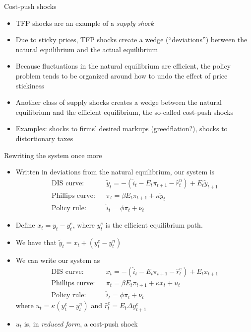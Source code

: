 \documentclass[9pt,xcolor={dvipsnames}]{beamer}
\newcommand{\bit}{\begin{itemize}}
\newcommand{\eit}{\end{itemize}}
\newcommand{\bc}{\color{blue}}
\begin{document}
\begin{frame}{Cost-push shocks}

\bit
\setlength\itemsep{1.5em}
\item TFP shocks are an example of a \emph{supply shock}

\item Due to sticky prices, TFP shocks create a wedge (``deviations'') between the {\bc natural equilibrium} and the actual equilibrium

\item Because fluctuations in the natural equilibrium are efficient, the policy problem tends to be organized around how to undo the effect of price stickiness

\item Another class of supply shocks creates a wedge between the {\bc natural equilibrium} and the {\bc efficient equilibrium}, the so-called {\bc cost-push shocks}

\item Examples: shocks to firms' desired markups (greedflation?), shocks to distortionary taxes
\eit

\end{frame}


\begin{frame}{Rewriting the system once more}

\bit
\setlength\itemsep{1.5em}
\item Written in deviations from the natural equilibrium, our system is
\begin{eqnarray}
\text{DIS curve:} && \tilde y_t = - (\hat i_t-E_t \pi_{t+1}-\hat r^n_t) + E_t \tilde y_{t+1}  \nonumber \\
\text{Phillips curve:} && \pi_t = \beta E_t \pi_{t+1} + \kappa \tilde y_t \nonumber \\
\text{Policy rule:} && \hat i_t = \phi \pi_t + \nu_t \nonumber 
\end{eqnarray}

\item Define $x_t = y_t-y^e_t$, where $y^e_t$ is the efficient equilibrium path.

\item We have that  $\tilde y_t = x_t + (y^e_t-y^n_t)$

\item We can write our system as
\begin{eqnarray}
\text{DIS curve:} && x_t = - (\hat i_t-E_t \pi_{t+1}-\hat r^e_t) + E_t x_{t+1}  \nonumber \\
\text{Phillips curve:} && \pi_t = \beta E_t \pi_{t+1} + \kappa x_t + u_t \nonumber \\
\text{Policy rule:} && \hat i_t = \phi \pi_t + \nu_t \nonumber 
\end{eqnarray}
where $u_t = \kappa (y^e_t-y^n_t)$ and $\hat r^e_t = E_t \Delta y^e_{t+1}$

\item $u_t$ is, in \emph{reduced form}, a cost-push shock

\eit

\end{frame}
\end{document}
